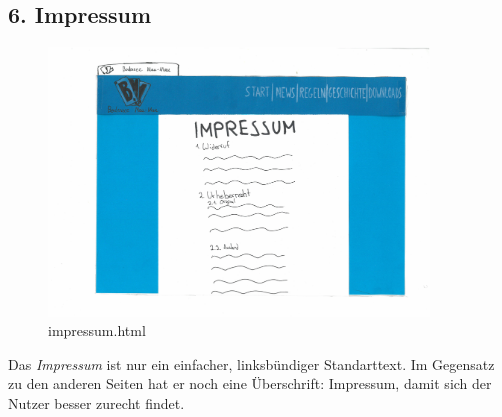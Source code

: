 \documentclass{scrartcl}
\begin{document}
\subsection*{6. Impressum}
  \begin{figure}[H]
 \begin{center}
 \includegraphics[width=0.9\textwidth]{impressum.jpg}
\caption{impressum.html}
 \end{center}
\end{figure}  
  Das \textit{Impressum} ist nur ein einfacher, linksbündiger Standarttext. Im Gegensatz zu den anderen Seiten hat er noch eine Überschrift: Impressum, damit sich der Nutzer besser zurecht findet.
\end{document}
